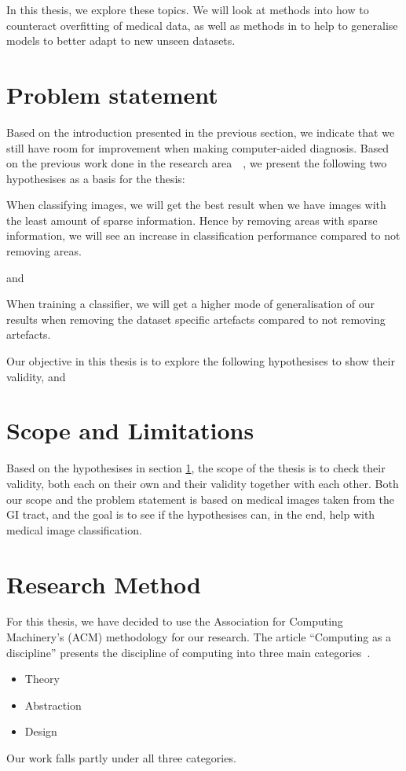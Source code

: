 In this thesis, we explore these topics. We will look at methods into how to counteract overfitting of medical data, as well as methods in to help to generalise models to better adapt to new unseen datasets.


\section{Problem statement}
\label{cha:problemstatement}
Based on the introduction presented in the previous section, we indicate that we still have room for improvement when making computer-aided diagnosis. Based on the previous work done in the research area~\cite{25956}~\cite{25953}, we present the following two hypothesises as a basis for the thesis:


\noindent
\begin{hyp} \label{hyp:a}
When classifying images, we will get the best result when we have images with the least amount of sparse information. 
Hence by removing areas with sparse information,
we will see an increase in classification performance compared to not removing areas.
\end{hyp}

\noindent
and

\noindent 
\begin{hyp} \label{hyp:b}
When training a classifier, we will get a higher
mode of generalisation of our results when removing the dataset
specific artefacts compared to not removing artefacts.
\end{hyp}
\vspace{5px}


Our objective in this thesis is to explore the following hypothesises to show their validity, and 


\section{Scope and Limitations}
Based on the hypothesises in section \ref{cha:problemstatement}, the scope of the thesis is to check their validity, both each on their own and their validity together with each other. 
Both our scope and the problem statement is based on medical images taken from the GI tract, and the goal is to see if the hypothesises can, in the end, help with medical image classification.


\section{Research Method}
For this thesis, we have decided to use the Association for Computing Machinery's (ACM) methodology for our research. The article ``Computing as a discipline'' presents the discipline of computing into three main categories~\cite{Denning:1989:CD:63238.63239}. 
\begin{itemize}
\item Theory
\item Abstraction
\item Design
\end{itemize}
Our work falls partly under all three categories.

